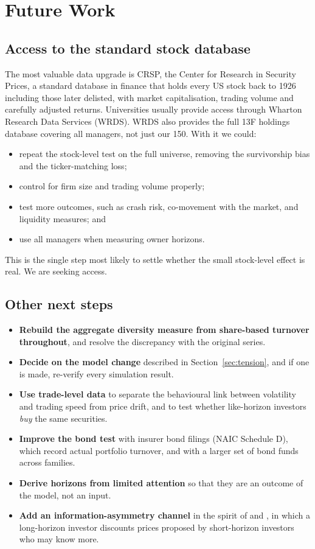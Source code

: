 \section{Future Work}
\label{sec:future}

\subsection{Access to the standard stock database}

The most valuable data upgrade is CRSP, the Center for Research in Security Prices, a standard database in finance that holds every US stock back to 1926 including those later delisted, with market capitalisation, trading volume and carefully adjusted returns. Universities usually provide access through Wharton Research Data Services (WRDS). WRDS also provides the full 13F holdings database covering all managers, not just our 150. With it we could:
\begin{itemize}[leftmargin=*]
\item repeat the stock-level test on the full universe, removing the survivorship bias and the ticker-matching loss;
\item control for firm size and trading volume properly;
\item test more outcomes, such as crash risk, co-movement with the market, and liquidity measures; and
\item use all managers when measuring owner horizons.
\end{itemize}
This is the single step most likely to settle whether the small stock-level effect is real. We are seeking access.

\subsection{Other next steps}
\begin{itemize}[leftmargin=*]
\item \textbf{Rebuild the aggregate diversity measure from share-based turnover throughout}, and resolve the discrepancy with the original series.
\item \textbf{Decide on the model change} described in Section~\ref{sec:tension}, and if one is made, re-verify every simulation result.
\item \textbf{Use trade-level data} to separate the behavioural link between volatility and trading speed from price drift, and to test whether like-horizon investors \emph{buy} the same securities.
\item \textbf{Improve the bond test} with insurer bond filings (NAIC Schedule D), which record actual portfolio turnover, and with a larger set of bond funds across families.
\item \textbf{Derive horizons from limited attention} \citep{sims2003} so that they are an outcome of the model, not an input.
\item \textbf{Add an information-asymmetry channel} in the spirit of \citet{kyle1985} and \citet{akerlof1970}, in which a long-horizon investor discounts prices proposed by short-horizon investors who may know more.
\end{itemize}

